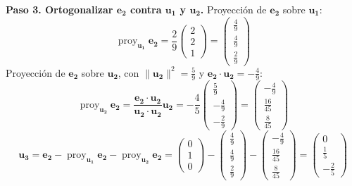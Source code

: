 \begin{example}
\begin{myproof}
\textbf{Paso 3. Ortogonalizar $\mathbf{e_2}$ contra $\mathbf{u_1}$ y $\mathbf{u_2}$.}
Proyección de $\mathbf{e_2}$ sobre $\mathbf{u_1}$:
\[
\operatorname{proy}_{\mathbf{u_1}} \mathbf{e_2} = \frac{2}{9} \begin{pmatrix} 2 \\ 2 \\ 1 \end{pmatrix} = \begin{pmatrix} \frac{4}{9} \\ \frac{4}{9} \\ \frac{2}{9} \end{pmatrix}
\]
Proyección de $\mathbf{e_2}$ sobre $\mathbf{u_2}$, con $\|\mathbf{u_2}\|^2 = \frac{5}{9}$ y $\mathbf{e_2} \cdot \mathbf{u_2} = -\frac{4}{9}$:
\[
\operatorname{proy}_{\mathbf{u_2}} \mathbf{e_2} = \frac{\mathbf{e_2} \cdot \mathbf{u_2}}{\mathbf{u_2} \cdot \mathbf{u_2}} \mathbf{u_2} = -\frac{4}{5} \begin{pmatrix} \frac{5}{9} \\ -\frac{4}{9} \\ -\frac{2}{9} \end{pmatrix} = \begin{pmatrix} -\frac{4}{9} \\ \frac{16}{45} \\ \frac{8}{45} \end{pmatrix}
\]
\[
\mathbf{u_3} = \mathbf{e_2} - \operatorname{proy}_{\mathbf{u_1}} \mathbf{e_2} - \operatorname{proy}_{\mathbf{u_2}} \mathbf{e_2} = \begin{pmatrix} 0 \\ 1 \\ 0 \end{pmatrix} - \begin{pmatrix} \frac{4}{9} \\ \frac{4}{9} \\ \frac{2}{9} \end{pmatrix} - \begin{pmatrix} -\frac{4}{9} \\ \frac{16}{45} \\ \frac{8}{45} \end{pmatrix} = \begin{pmatrix} 0 \\ \frac{1}{5} \\ -\frac{2}{5} \end{pmatrix}
\]


\end{myproof}
\end{example}
